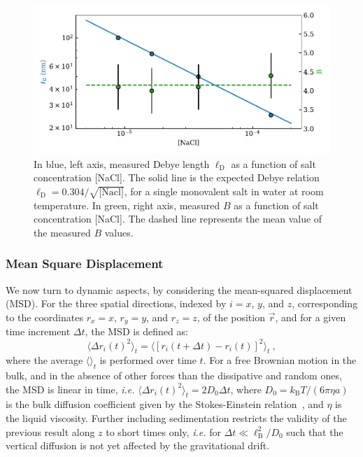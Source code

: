 \begin{figure}[H]
	\centering
	\includegraphics{02_body/chapter3/images/trajctory_analysis/ld.pdf}
	\caption{In blue, left axis, measured Debye length $\ell_\mathrm{D}$ as a function of salt concentration [NaCl]. The solid line is the expected Debye relation $\ell_\mathrm{D}=0.304/\sqrt{\textrm{[Nacl]}}$, for a single monovalent salt in water at room temperature. In green, right axis, measured $B$ as a function of salt  concentration [NaCl]. The dashed line represents the mean value of the measured $B$ values.}
	\label{fig.ld}
\end{figure}


\subsubsection{Mean Square Displacement}

We now turn to dynamic aspects, by considering the mean-squared displacement (MSD). For the three spatial directions, indexed by $i=x$, $y$, and $z$, corresponding to the coordinates $r_x=x$, $r_y=y$, and $r_z=z$, of the position $\vec{r}$, and for a given time increment $\Delta t$, the MSD is defined as:
\begin{equation}
	\langle\Delta r_i(t)^2 \rangle_t = \langle[r_i(t+\Delta t) - r_i(t)]^2\rangle_t\ ,
	\label{MSDdef}
\end{equation}
where the average $\langle\rangle_t$ is performed over time $t$. For a free Brownian motion in the bulk, and in the absence of other forces than the dissipative and random ones, the \gls{MSD} is linear in time, \textit{i.e.} $\langle\Delta r_i(t)^2 \rangle_t = 2 D_0 \Delta t$, where $D_0=k_\mathrm{B}T/(6\pi\eta a)$ is the bulk diffusion coefficient given by the Stokes-Einstein relation~\cite{einstein_uber_1905}, and $\eta$ is the liquid viscosity. Further including sedimentation restricts the validity of the previous result along $z$ to short times only, \textit{i.e.} for $\Delta t\ll\ell_{\textrm{B}}^2/D_0$ such that the vertical diffusion is not yet affected by the gravitational drift.

